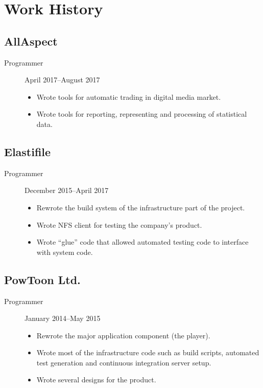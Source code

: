 \documentclass[11pt]{article}
\begin{document}
\section*{Work History}
\label{sec-2}

\subsection*{AllAspect}
\label{sec-2-1}
\begin{description}
\item[{Programmer}] April 2017--August 2017
\begin{itemize}
\item Wrote tools for automatic trading in digital media market.
\item Wrote tools for reporting, representing and processing of
statistical data.
\end{itemize}
\end{description}

\subsection*{Elastifile}
\label{sec-2-2}
\begin{description}
\item[{Programmer}] December 2015--April 2017
\begin{itemize}
\item Rewrote the build system of the infrastructure part of the
project.
\item Wrote NFS client for testing the company's product.
\item Wrote ``glue'' code that allowed automated testing code to
interface with system code.
\end{itemize}
\end{description}

\subsection*{PowToon Ltd.}
\label{sec-2-3}
\begin{description}
\item[{Programmer}] January 2014--May 2015
\begin{itemize}
\item Rewrote the major application component (the player).
\item Wrote most of the infrastructure code such as build scripts,
automated test generation and continuous integration server
setup.
\item Wrote several designs for the product.
\end{itemize}
\end{description}
\end{document}
